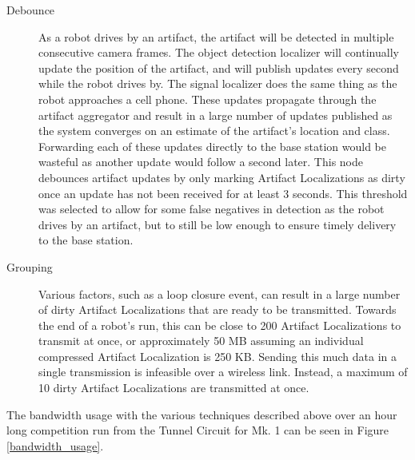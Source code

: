 \begin{description}
	\item[Debounce] As a robot drives by an artifact, the artifact will be detected in multiple consecutive camera frames. The object detection localizer will continually update the position of the artifact, and will publish updates every second while the robot drives by. The signal localizer does the same thing as the robot approaches a cell phone. These updates propagate through the artifact aggregator and result in a large number of updates published as the system converges on an estimate of the artifact's location and class. Forwarding each of these updates directly to the base station would be wasteful as another update would follow a second later. This node debounces artifact updates by only marking Artifact Localizations as dirty once an update has not been received for at least 3 seconds. This threshold was selected to allow for some false negatives in detection as the robot drives by an artifact, but to still be low enough to ensure timely delivery to the base station.
	
	\item[Grouping] Various factors, such as a loop closure event, can result in a large number of dirty Artifact Localizations that are ready to be transmitted. Towards the end of a robot's run, this can be close to 200 Artifact Localizations to transmit at once, or approximately 50 MB assuming an individual compressed Artifact Localization is 250 KB. Sending this much data in a single transmission is infeasible over a wireless link. Instead, a maximum of 10 dirty Artifact Localizations are transmitted at once.
	
\end{description}

The bandwidth usage with the various techniques described above over an hour long competition run from the Tunnel Circuit for Mk. 1 can be seen in Figure \ref{bandwidth_usage}.

